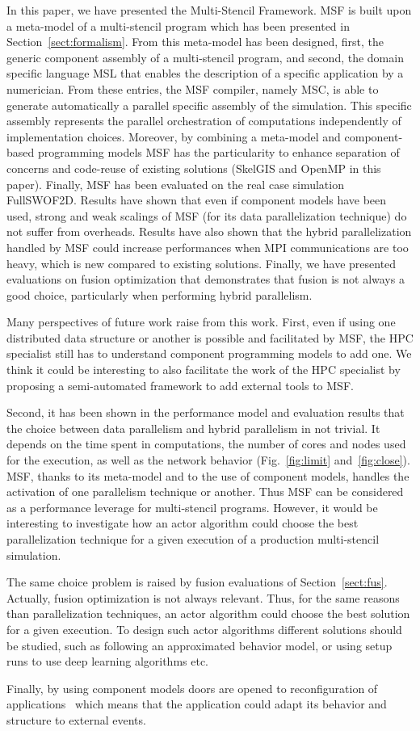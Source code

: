 In this paper, we have presented the Multi-Stencil Framework. MSF is built upon a meta-model of a multi-stencil program which has been presented in Section~\ref{sect:formalism}. From this meta-model has been designed, first, the generic component assembly of a multi-stencil program, and second, the domain specific language MSL that enables the description of a specific application by a numerician. From these entries, the MSF compiler, namely MSC, is able to generate automatically a parallel specific assembly of the simulation. This specific assembly represents the parallel orchestration of computations independently of implementation choices. Moreover, by combining a meta-model and component-based programming models MSF has the particularity to enhance separation of concerns and code-reuse of existing solutions (\eg SkelGIS and OpenMP in this paper). Finally, MSF has been evaluated on the real case simulation FullSWOF2D. Results have shown that even if component models have been used, strong and weak scalings of MSF (for its data parallelization technique) do not suffer from overheads. Results have also shown that the hybrid parallelization handled by MSF could increase performances when MPI communications are too heavy, which is new compared to existing solutions. Finally, we have presented evaluations on fusion optimization that demonstrates that fusion is not always a good choice, particularly when performing hybrid parallelism.

Many perspectives of future work raise from this work. First, even if using one distributed data structure or another is possible and facilitated by MSF, the HPC specialist still has to understand component programming models to add one. We think it could be interesting to also facilitate the work of the HPC specialist by proposing a semi-automated framework to add external tools to MSF.

Second, it has been shown in the performance model and evaluation results that the choice between data parallelism and hybrid parallelism in not trivial. It depends on the time spent in computations, the number of cores and nodes used for the execution, as well as the network behavior (Fig.~\ref{fig:limit} and~\ref{fig:close}). MSF, thanks to its meta-model and to the use of component models, handles the activation of one parallelism technique or another. Thus MSF can be considered as a performance leverage for multi-stencil programs. However, it would be interesting to investigate how an actor algorithm could choose the best parallelization technique for a given execution of a production multi-stencil simulation.

The same choice problem is raised by fusion evaluations of Section~\ref{sect:fus}. Actually, fusion optimization is not always relevant. Thus, for the same reasons than parallelization techniques, an actor algorithm could choose the best solution for a given execution. To design such actor algorithms different solutions should be studied, such as following an approximated behavior model, or using setup runs to use deep learning algorithms etc.

Finally, by using component models doors are opened to reconfiguration of applications~\cite{Lanore:2015:RCM:2737166.2737169} which means that the application could adapt its behavior and structure to external events.